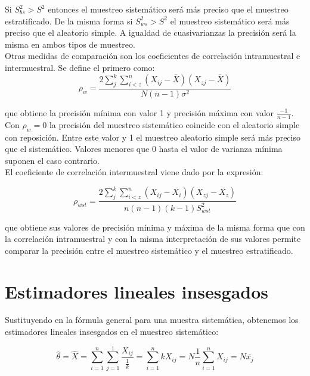 Si $S_{bs}^2 > S^2$ entonces el muestreo sistemático será más preciso que el muestreo estratificado. De la misma forma si $S_{ws}^2 > S^2$ el muestreo sistemático será más preciso que el aleatorio simple. A igualdad de cuasivarianzas la precisión será la misma en ambos tipos de muestreo.\\

Otras medidas de comparación son los coeficientes de correlación intramuestral e intermuestral. Se define el primero como:\\

\begin{equation}
    \rho_{w} = \frac{2\sum\limits_j^k\sum\limits_{i<z}^n(X_{ij}-\bar{X})(X_{zj}-\bar{X})}{N(n-1)\sigma^2}
\end{equation}

 que obtiene la precisión mínima con valor 1 y precisión máxima con valor $\frac{-1}{n-1}$.\\
 
 Con $\rho_w = 0$ la precisión del muestreo sistemático coincide con el aleatorio simple con reposición. Entre este valor y 1 el muestreo aleatorio simple será más preciso que el sistemático. Valores menores que 0 hasta el valor de varianza mínima suponen el caso contrario.\\

 El coeficiente de correlación intermuestral viene dado por la expresión:
 
\begin{equation}
    \rho_{wst} = \frac{2\sum\limits_j^k\sum\limits_{i<z}^n(X_{ij}-\bar{X_i})(X_{zj}-\bar{X_z})}{n(n-1)(k-1)S_{wst}^2}
\end{equation}

 que obtiene sus valores de precisión mínima y máxima de la misma forma que con la correlación intramuestral y con la misma interpretación de sus valores permite comparar la precisión entre el muestreo sistemático y el muestreo estratificado.


\section{Estimadores lineales insesgados} \label{sect:5.3}

Sustituyendo en la fórmula general para una muestra sistemática, obtenemos los estimadores lineales insesgados en el muestreo sistemático:

\begin{equation}
    \hat{\theta} = \hat{X} = \sum_{i=1}^{n}\sum_{j=1}^1\frac{X_{ij}}{\frac{1}{k}} = \sum_{i=1}^{n}kX_{ij} = N\frac{1}{n}\sum_{i=1}^{n}X_{ij} = N\bar{x_j}
\end{equation}

